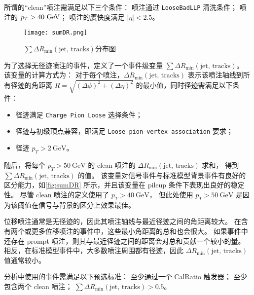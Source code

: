 所谓的“clean”喷注需满足以下三个条件：
喷注通过 \texttt{LooseBadLLP} 清洗条件；
喷注的 \(p_T > 40~\text{GeV} \)；
喷注的赝快度满足 \(|\eta| < 2.5\)。

\begin{figure}[ht]
    \centering
    \texttt{[image: sumDR.png]}
    \caption{$\sum \Delta R_{\text{min}}(\text{jet, tracks})$分布图\cite{ATLAS:2022zhj}}
    \label{fig:sumDR}
\end{figure}

为了选择无径迹喷注的事件，定义了一个事件级变量 $\sum \Delta R_{\text{min}}(\text{jet, tracks})$。
该变量的计算方式为：
对于每个喷注，\(\Delta R_{\text{min}}(\text{jet, tracks})\) 表示该喷注轴线到所有径迹的角距离
$R = \sqrt{(\Delta \phi)^2 + (\Delta \eta)^2}$ 的最小值，同时径迹需满足以下条件：
\begin{itemize}
    \item 径迹满足 \texttt{Charge Pion Loose}\cite{CPgroup} 选择条件；
    \item 径迹与初级顶点兼容，即满足 \texttt{Loose pion-vertex association}\cite{CPgroup} 要求；
    \item 径迹 \(p_T > 2~\text{GeV}\)。
\end{itemize}
随后，将每个 \(p_T > 50~\text{GeV}\) 的 clean 喷注的 \(\Delta R_{\text{min}}(\text{jet, tracks})\) 求和，
得到 \(\sum \Delta R_{\text{min}}(\text{jet, tracks})\) 的值。
该变量对信号事件与标准模型背景事件有良好的区分能力，如\autoref{fig:sumDR} 所示，并且该变量在 pileup 条件下表现出良好的稳定性。
尽管 clean 喷注的定义使用了 \(p_T > 40~\text{GeV}\)，
但此处使用 \(p_T > 50~\text{GeV}\) 是因为该阈值在信号与背景的区分上效果最佳。

位移喷注通常是无径迹的，因此其喷注轴线与最近径迹之间的角距离较大。
在含有两个或更多位移喷注的事件中，这些最小角距离的总和也会很大。
如果事件中还存在 prompt 喷注，则其与最近径迹之间的距离会对总和贡献一个较小的量。
相反，在标准模型事件中，大多数喷注周围都有径迹，因此 \(\Delta R_{\text{min}}(\text{jet, tracks})\) 值通常较小。

分析中使用的事件需满足以下预选标准：
至少通过一个 CalRatio 触发器；
至少包含两个 clean 喷注；
\(\sum \Delta R_{\text{min}}(\text{jet, tracks}) > 0.5\)。



